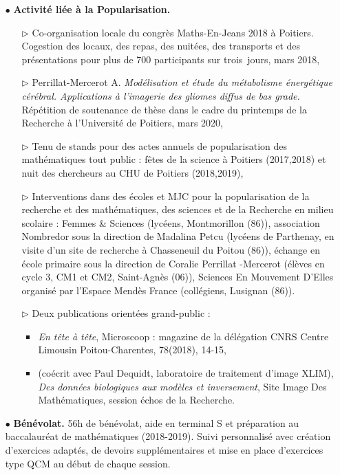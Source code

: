 \documentclass[a4paper, 12pt, twoside, openright]{article}
\begin{document}
\begin{itemize}
\item[\color{MagSombre}$\bullet$] \textbf{\color{MagSombre}Activité liée à la Popularisation.}
\begin{itemize}
\item[$\triangleright$] Co-organisation locale du congrès Maths-En-Jeans 2018 à Poitiers. Cogestion des locaux, des repas, des nuitées, des transports et des présentations pour plus de 700 participants sur trois~jours, mars 2018,
\item[$\triangleright$] Perrillat-Mercerot A. \textit{Modélisation et étude du métabolisme énergétique cérébral. Applications à l’imagerie des gliomes diffus de bas grade.} Répétition de soutenance de thèse dans le cadre du printemps de la Recherche à l'Université de Poitiers, mars 2020,
\item[$\triangleright$] Tenu de stands pour des actes annuels de popularisation des mathématiques tout public : fêtes de la science à Poitiers (2017,2018) et nuit des chercheurs au CHU de Poitiers (2018,2019),
\item[$\triangleright$] Interventions dans des écoles et MJC pour la popularisation de la recherche et des mathématiques, des sciences et de la Recherche en milieu scolaire : Femmes \& Sciences (lycéens, Montmorillon (86)), association Nombredor sous la direction de Madalina Petcu (lycéens de Parthenay, en visite d'un site de recherche à Chasseneuil du Poitou (86)), échange en école primaire sous la direction de Coralie Perrillat -Mercerot (élèves en cycle 3, CM1 et CM2, Saint-Agnès (06)), Sciences En Mouvement D'Elles organisé par l'Espace Mendès France (collégiens, Lusignan (86)).
\item[$\triangleright$] Deux publications orientées grand-public :
\begin{itemize}
\item \textit{En tête à tête}, Microscoop : magazine de la délégation CNRS Centre
Limousin Poitou-Charentes, 78(2018), 14-15,
\item  (coécrit avec Paul Dequidt, laboratoire de traitement d'image XLIM), \textit{Des données biologiques aux modèles
et inversement}, Site Image Des Mathématiques, session échos de la Recherche.
\end{itemize}
\end{itemize}
\item[\color{MagSombre}$\bullet$] \textbf{\color{MagSombre}Bénévolat.} 56h de bénévolat, aide en terminal S et préparation au baccalauréat de mathématiques (2018-2019). Suivi personnalisé avec création d'exercices adaptés, de devoirs supplémentaires et mise en place d'exercices type QCM au début de chaque session.
\end{itemize}
\end{document}
